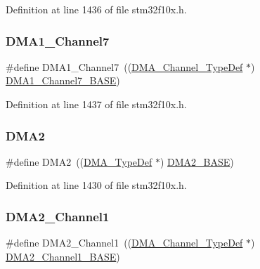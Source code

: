 Definition at line 1436 of file stm32f10x.\+h.

\mbox{\label{group___peripheral__declaration_ga4f9c23b3d1add93ed206b5c9afa5cda3}} 
\subsubsection{\texorpdfstring{D\+M\+A1\+\_\+\+Channel7}{DMA1\_Channel7}}
{\footnotesize\ttfamily \#define D\+M\+A1\+\_\+\+Channel7~((\hyperlink{struct_d_m_a___channel___type_def}{D\+M\+A\+\_\+\+Channel\+\_\+\+Type\+Def} $\ast$) \hyperlink{group___peripheral__memory__map_gaeee0d1f77d0db1db533016a09351166c}{D\+M\+A1\+\_\+\+Channel7\+\_\+\+B\+A\+SE})}



Definition at line 1437 of file stm32f10x.\+h.

\mbox{\label{group___peripheral__declaration_ga506520140eec1708bc7570c49bdf972d}} 
\subsubsection{\texorpdfstring{D\+M\+A2}{DMA2}}
{\footnotesize\ttfamily \#define D\+M\+A2~((\hyperlink{struct_d_m_a___type_def}{D\+M\+A\+\_\+\+Type\+Def} $\ast$) \hyperlink{group___peripheral__memory__map_gab72a9ae145053ee13d1d491fb5c1df64}{D\+M\+A2\+\_\+\+B\+A\+SE})}



Definition at line 1430 of file stm32f10x.\+h.

\mbox{\label{group___peripheral__declaration_gad86c75e1ff89e03e15570f47962865c8}} 
\subsubsection{\texorpdfstring{D\+M\+A2\+\_\+\+Channel1}{DMA2\_Channel1}}
{\footnotesize\ttfamily \#define D\+M\+A2\+\_\+\+Channel1~((\hyperlink{struct_d_m_a___channel___type_def}{D\+M\+A\+\_\+\+Channel\+\_\+\+Type\+Def} $\ast$) \hyperlink{group___peripheral__memory__map_gad3bd6c4201d12f5d474518c1b02f8e3b}{D\+M\+A2\+\_\+\+Channel1\+\_\+\+B\+A\+SE})}



